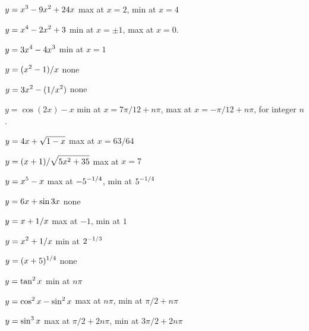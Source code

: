 \exercise $\displaystyle y=x^3-9x^2+24x$
\answer max at $x=2$, min at $x=4$
\endanswer
\endexercise

\exercise $\displaystyle y=x^4-2x^2+3$ 
\answer min at $x=\pm 1$, max at $x=0$.
\endanswer
\endexercise

\exercise $\displaystyle y=3x^4-4x^3$
\answer min at $x=1$
\endanswer
\endexercise

\exercise $\displaystyle y=(x^2-1)/x$
\answer none
\endanswer
\endexercise

\exercise $\displaystyle y=3x^2-(1/x^2)$ 
\answer none
\endanswer
\endexercise

\exercise $y=\cos(2x)-x$ 
\answer min at $x=7\pi/12+n\pi$, max at $x=-\pi/12+n\pi$, for integer $n$.
\endanswer
\endexercise

\exercise $\displaystyle y = 4x+\sqrt{1-x}$
\answer max at $x=63/64$
\endanswer
\endexercise

\exercise $\displaystyle y = (x+1)/\sqrt{5x^2 + 35}$
\answer max at $x=7$
\endanswer
\endexercise

\exercise $\displaystyle y= x^5 - x$
\answer max at $\displaystyle -5^{-1/4}$, min at $\displaystyle 5^{-1/4}$
\endanswer
\endexercise

\exercise $\displaystyle y = 6x +\sin 3x$
\answer none
\endanswer
\endexercise

\exercise $\displaystyle y = x+ 1/x$
\answer max at $-1$, min at $1$
\endanswer
\endexercise

\exercise $\displaystyle y = x^2+ 1/x$
\answer min at $\displaystyle 2^{-1/3}$
\endanswer
\endexercise

\exercise $\displaystyle y = (x+5)^{1/4}$
\answer none
\endanswer
\endexercise

\exercise $\displaystyle y = \tan^2 x$
\answer min at $n\pi$
\endanswer
\endexercise

\exercise $\displaystyle y =\cos^2 x - \sin^2 x$
\answer max at $n\pi$, min at $\pi/2+n\pi$
\endanswer
\endexercise

\exercise $\displaystyle y = \sin^3 x$
\answer max at $\pi/2+2n\pi$, min at $3\pi/2+2n\pi$
\endanswer

\endtwocol
\endexercise

\endexercises

